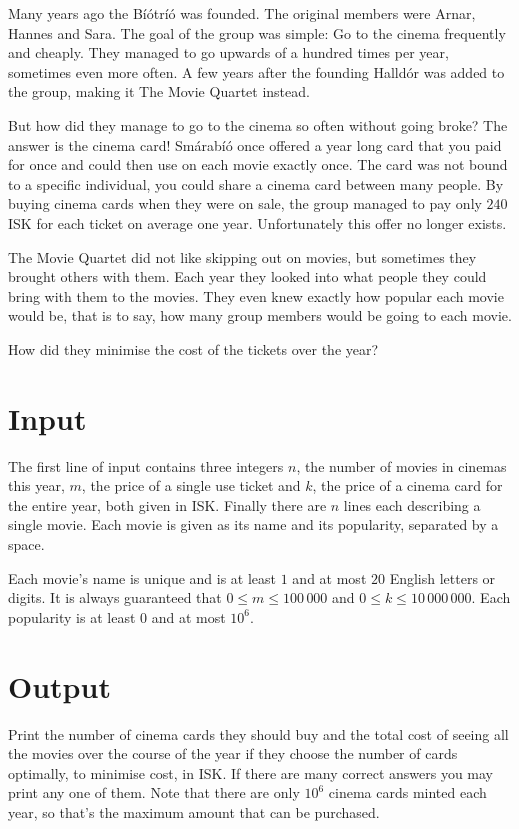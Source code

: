 
Many years ago the Bíótríó was founded.
The original members were Arnar, Hannes and Sara.
The goal of the group was simple: Go to the cinema frequently and cheaply.
They managed to go upwards of a hundred times per year, sometimes even more often.
A few years after the founding Halldór was added to the group, making it The Movie Quartet instead.

But how did they manage to go to the cinema so often without going broke?
The answer is the cinema card!
Smárabíó once offered a year long card that you paid for once and could then use on each movie
exactly once. 
The card was not bound to a specific individual, you could share a cinema card between many people.
By buying cinema cards when they were on sale,
the group managed to pay only $240$ ISK for each ticket on average one year.
Unfortunately this offer no longer exists.

The Movie Quartet did not like skipping out on movies, but sometimes they brought others with them.
Each year they looked into what people they could bring with them to the movies.
They even knew exactly how popular each movie would be, that is to say,
how many group members would be going to each movie.

How did they minimise the cost of the tickets over the year?

\section*{Input}
The first line of input contains three integers $n$,
the number of movies in cinemas this year,
$m$, the price of a single use ticket and $k$,
the price of a cinema card for the entire year,
both given in ISK.
Finally there are $n$ lines each describing a single movie.
Each movie is given as its name and its popularity, separated by a space.

Each movie's name is unique and is at least $1$ and at most $20$ English letters or digits.
It is always guaranteed that $0 \leq m \leq 100\,000$ and $0 \leq k \leq 10\,000\,000$.
Each popularity is at least $0$ and at most $10^6$.

\section*{Output}
Print the number of cinema cards they should buy and the total cost of seeing all the movies
over the course of the year if they choose the number of cards optimally, to minimise cost, in ISK.
If there are many correct answers you may print any one of them.
Note that there are only $10^6$ cinema cards minted each year, so that's the maximum amount that
can be purchased.

